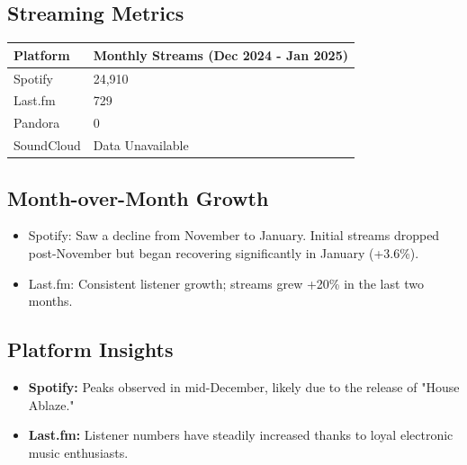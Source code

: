 \documentclass[a4paper,12pt]{article}
\begin{document}
\subsection*{Streaming Metrics}
\begin{tabular}{|l|l|}
\hline
\textbf{Platform}    & \textbf{Monthly Streams (Dec 2024 - Jan 2025)} \\ \hline
Spotify              & 24,910                                    \\ \hline
Last.fm              & 729                                       \\ \hline
Pandora              & 0                                         \\ \hline
SoundCloud           & Data Unavailable                          \\ \hline
\end{tabular}

\vspace{0.5cm}
\subsection*{Month-over-Month Growth}
\begin{itemize}
    \item Spotify: Saw a decline from November to January. Initial streams dropped post-November but began recovering significantly in January (+3.6\%).
    \item Last.fm: Consistent listener growth; streams grew +20\% in the last two months.
\end{itemize}

\subsection*{Platform Insights}
\begin{itemize}
    \item \textbf{Spotify:} Peaks observed in mid-December, likely due to the release of "House Ablaze."
    \item \textbf{Last.fm:} Listener numbers have steadily increased thanks to loyal electronic music enthusiasts.
\end{itemize}

\begin{center}
\end{center}
\end{document}
